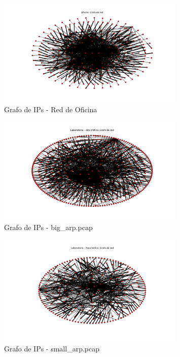 \begin{figure}[h!]
  \centering
    \includegraphics[width=0.8\textwidth]{graficos/grafoOficina.png}
    \caption{Grafo de IPs - Red de Oficina}
    \label{fig:grafo1}
\end{figure}

\begin{figure}[h!]
  \centering
    \includegraphics[width=0.8\textwidth]{graficos/grafoLaboBig.png}
    \caption{Grafo de IPs - big\_arp.pcap}
    \label{fig:grafo1}
\end{figure}

\begin{figure}[h!]
  \centering
    \includegraphics[width=0.8\textwidth]{graficos/grafoLaboSmall.png}
    \caption{Grafo de IPs - small\_arp.pcap}
    \label{fig:grafo1}
\end{figure}

